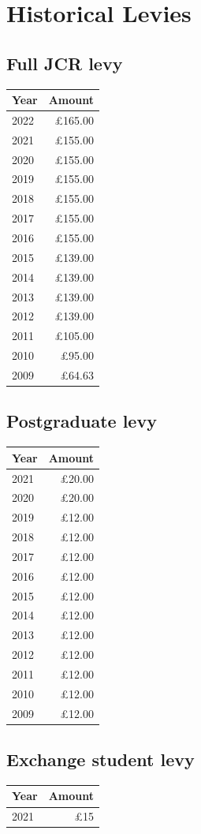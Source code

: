 \documentclass[12pt]{article}
\begin{document}
\section{Historical Levies}
\subsection{Full JCR levy}
\begin{center}
\begin{tabular}{|l|r|}\hline
    \textbf{Year} & \textbf{Amount} \\\hline
    2022 & £165.00 \\
    2021 & £155.00 \\
    2020 & £155.00 \\
    2019 & £155.00 \\
    2018 & £155.00 \\
    2017 & £155.00 \\
    2016 & £155.00 \\
    2015 & £139.00 \\
    2014 & £139.00 \\
    2013 & £139.00 \\
    2012 & £139.00 \\
    2011 & £105.00 \\
    2010 &  £95.00 \\
    2009 &  £64.63 \\
    \hline
\end{tabular}
\end{center}

\subsection{Postgraduate levy}
\begin{center}
\begin{tabular}{|l|r|}\hline
    \textbf{Year} & \textbf{Amount} \\\hline
    2021 & £20.00 \\
    2020 & £20.00 \\
    2019 & £12.00 \\
    2018 & £12.00 \\
    2017 & £12.00 \\
    2016 & £12.00 \\
    2015 & £12.00 \\
    2014 & £12.00 \\
    2013 & £12.00 \\
    2012 & £12.00 \\
    2011 & £12.00 \\
    2010 & £12.00 \\
    2009 & £12.00 \\
    \hline
\end{tabular}
\end{center}

\subsection{Exchange student levy}
\begin{center}
\begin{tabular}{|l|r|}\hline
    \textbf{Year} & \textbf{Amount} \\\hline
    2021 & £15 \\
    \hline
\end{tabular}
\end{center}
\end{document}
